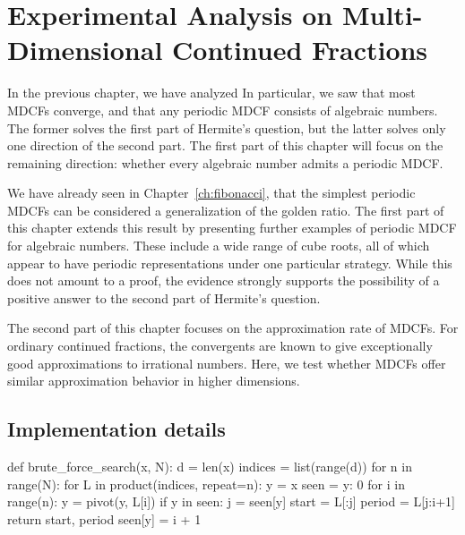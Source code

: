 \chapter{Experimental Analysis on Multi-Dimensional Continued Fractions}
\label{ch:implementation}

In the previous chapter, we have analyzed
In particular, we saw that most MDCFs converge,
and that any periodic MDCF consists of algebraic numbers.
The former solves the first part of Hermite's question, but the latter solves
only one direction of the second part.
The first part of this chapter will focus on the remaining direction:
whether every algebraic number admits a periodic MDCF.

We have already seen in Chapter~\ref{ch:fibonacci},
that the simplest periodic MDCFs can be considered a generalization of the
golden ratio.
The first part of this chapter extends this result by presenting further
examples of periodic MDCF for algebraic numbers.
These include a wide range of cube roots,
all of which appear to have periodic representations under one particular strategy.
While this does not amount to a proof, the evidence strongly supports
the possibility of a positive answer to the second part of Hermite’s question.

The second part of this chapter focuses on the approximation rate of MDCFs.
For ordinary continued fractions, the convergents are known to give
exceptionally good approximations to irrational numbers.
Here, we test whether MDCFs offer similar approximation behavior in higher dimensions.

\section{Implementation details}

\begin{Python}[
    float=tbp,
    numbers=left,
    label={lst:bfs},
    caption={
      The implementation of the brute-force search for finding a periodic representation.
      The program iterates over all sequences with a maximum length of $N$
      until it finds a duplicate vector.
    }
  ]
def brute_force_search(x, N):
  d = len(x)
  indices = list(range(d))
  for n in range(N):
    for L in product(indices, repeat=n):
      y = x
      seen = {y: 0}
      for i in range(n):
        y = pivot(y, L[i])
        if y in seen:
          j = seen[y]
          start = L[:j]
          period = L[j:i+1]
          return start, period
        seen[y] = i + 1
\end{Python}

